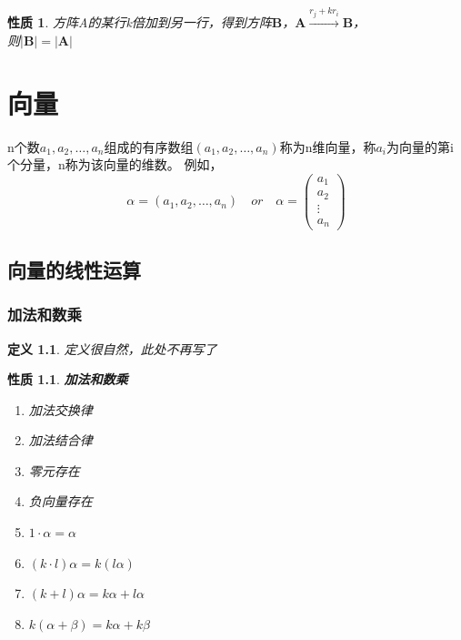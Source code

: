 \documentclass[12pt,oneside]{ctexbook}
\newtheorem{definition}[subsection]{定义}
\newtheorem{property}[subsection]{性质}
\begin{document}
\begin{property}
    方阵A的某行k倍加到另一行，得到方阵\(\mathbf{B}\)，\(\mathbf{A} \xrightarrow{r_j+kr_i} \mathbf{B}\)，
    \\则\(\rvert\mathbf{B}\rvert=\rvert\mathbf{A}\rvert\)
\end{property}

\part{向量}
n个数\(a_1,a_2,\dots,a_n\)组成的有序数组\((a_1,a_2,\dots,a_n)\)称为n维向量，称\(a_i\)为向量的第i个分量，n称为该向量的维数。
例如，
\[\alpha = (a_1,a_2,\dots,a_n) \quad or \quad \alpha =\begin{pmatrix}
    a_1
    \\a_2
    \\ \vdots
    \\a_n
\end{pmatrix}\]

\chapter{向量的线性运算}
\section{加法和数乘}
\begin{definition}
    定义很自然，此处不再写了
\end{definition}
\begin{property}
    \textbf{加法和数乘}
    \begin{enumerate}
        \item 加法交换律
        \item 加法结合律
        \item 零元存在
        \item 负向量存在
        \item \(1 \cdot \alpha = \alpha\)
        \item \((k\cdot l)\alpha=k(l \alpha)\)
        \item \((k+l)\alpha = k \alpha + l \alpha\)
        \item \(k(\alpha + \beta) = k \alpha + k \beta\)
    \end{enumerate}
\end{property}
\end{document}
